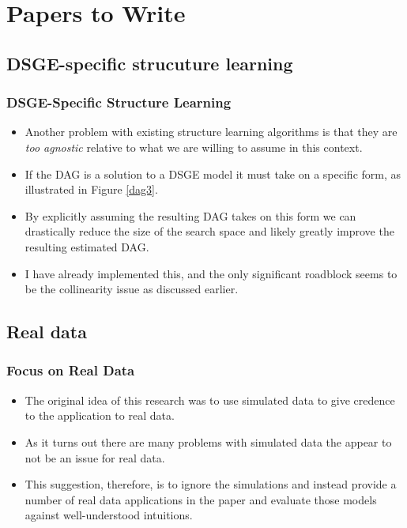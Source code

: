 \documentclass{beamer}
\begin{document}
\section{Papers to Write}

\subsection{DSGE-specific strucuture learning}
\begin{frame}
    \frametitle{DSGE-Specific Structure Learning}
    \begin{itemize}
        \item Another problem with existing structure learning algorithms is that they are \textit{too agnostic} relative to what we are willing to assume in this context. 
        \item If the DAG is a solution to a DSGE model it must take on a specific form, as illustrated in Figure \ref{dag3}.
        \item By explicitly assuming the resulting DAG takes on this form we can drastically reduce the size of the search space and likely greatly improve the resulting estimated DAG.
        \item I have already implemented this, and the only significant roadblock seems to be the collinearity issue as discussed earlier.
    \end{itemize}
\end{frame}

\subsection{Real data}
\begin{frame}
    \frametitle{Focus on Real Data}
    \begin{itemize}
        \item The original idea of this research was to use simulated data to give credence to the application to real data.
        \item As it turns out there are many problems with simulated data the appear to not be an issue for real data.
        \item This suggestion, therefore, is to ignore the simulations and instead provide a number of real data applications in the paper and evaluate those models against well-understood intuitions.
    \end{itemize}
\end{frame}
\end{document}
